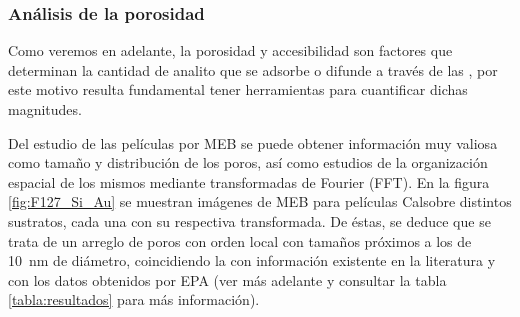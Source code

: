 	 	\subsubsection{Análisis de la porosidad}

		 Como veremos en adelante, la porosidad y accesibilidad son factores que determinan la cantidad de analito que se adsorbe o difunde a través de las \pdm, por este motivo resulta fundamental tener herramientas para cuantificar dichas magnitudes. 

		 Del estudio de las películas por MEB se puede obtener información muy valiosa como tamaño y distribución de los poros, así como estudios de la organización espacial de los mismos mediante transformadas de Fourier (FFT). En la figura \ref{fig:F127_Si_Au} se muestran imágenes de MEB para películas Cal\pdmF\space sobre distintos sustratos, cada una con su respectiva transformada. De éstas, se deduce que se trata de un arreglo de poros con orden local con tamaños próximos a los de \SI{10}{\nm} de diámetro, coincidiendo la con información existente en la literatura\cite{urade2005,angelome2011,lee2006} y con los datos obtenidos por EPA (ver más adelante y consultar la tabla \ref{tabla:resultados} para más información).  

